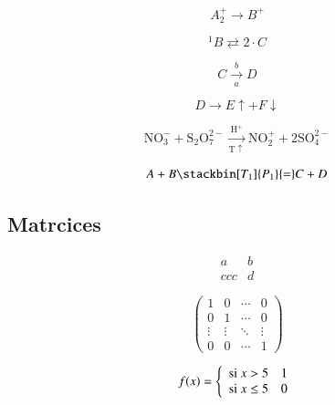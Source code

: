 \documentclass[12pt,letterpaper]{article}
\begin{document}
\begin{equation}
A_{2}^{+} \rightarrow B^{+}
\end{equation}

\begin{equation}
^{1}B \rightleftarrows 2 \cdot C
\end{equation}

\begin{equation}
C \xrightarrow[a]{b} D
\end{equation}

\begin{equation} 
D \rightarrow E\uparrow + F\downarrow
\end{equation}


\begin{equation}
\mathrm{NO_{3}^{-} + S_{2}O_{7}^{2-} \xrightarrow[T\uparrow]{H^{+}} NO_{2}^{+} + 2 SO_{4}^{2-}}
\end{equation}


\begin{equation}
A + B \stackbin[T_1]{P_1}{=} C + D
\end{equation} 
\newpage
\subsection{Matrcices}


\begin{equation}
\begin{array}{cc}
a & b \\
ccc & d
\end{array}
\end{equation}


\begin{equation}
\left(
\begin{array}{cccc}
1 & 0 & \cdots & 0 \\
0 & 1 & \cdots & 0 \\
\vdots & \vdots & \ddots & \vdots \\
0 & 0 & \cdots & 1
\end{array}
\right)
\end{equation}




\begin{equation}
f(x) = \left\lbrace
\begin{array}{ll}
\textup{si } x>5 & 1\\
\textup{si } x\leq 5 & 0
\end{array}
\right.
\end{equation}
\end{document}
